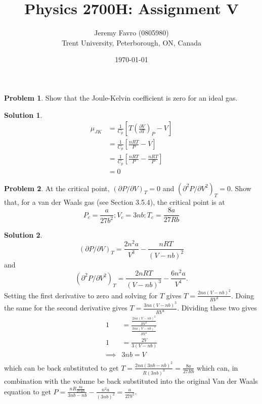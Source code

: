 \documentclass[10pt]{article}
\title{Physics 2700H: Assignment V}
\author{Jeremy Favro (0805980) \\ Trent University, Peterborough, ON, Canada}
\date{\today}
\theoremstyle{definition}
\newtheorem{problem}{Problem}
\newtheorem{soln}{Solution}
\begin{document}
\maketitle

\begin{problem}
Show that the Joule-Kelvin coefficient is zero for an ideal gas.
\end{problem}
\begin{soln}
  \begin{align*}
    \mu_{JK} & =\frac{1}{C_p}\left[T\left(\frac{\partial V}{\partial T}\right)_P-V\right] \\
             & =\frac{1}{C_p}\left[\frac{nRT}{P}-V\right]                                 \\
             & =\frac{1}{C_p}\left[\frac{nRT}{P}-\frac{nRT}{P}\right]                     \\
             & = 0
  \end{align*}
\end{soln}

\begin{problem}
At the critical point, $(\partial P/\partial V)_T = 0$ and $(\partial^2 P/\partial V^2)_T = 0$. Show that, for a
van der Waals gas (see Section 3.5.4), the critical point is at
$$P_c=\frac{a}{27b^2};V_c=3nb; T_c=\frac{8a}{27Rb}$$
\end{problem}
\begin{soln}
  $$(\partial P/\partial V)_T=\frac{2n^2a}{V^3}-\frac{nRT}{\left(V-nb\right)^2}$$
  and
  $$(\partial^2 P/\partial V^2)_T=\frac{2nRT}{\left(V-nb\right)^3}-\frac{6n^2a}{V^4}.$$
  Setting the first derivative to zero and solving for $T$ gives $T=\frac{2na\left(V-nb\right)^2}{RV^3}$. Doing
  the same for the second derivative gives $T=\frac{3na\left(V-nb\right)^3}{RV^4}$. Dividing these two gives
  \begin{align*}
    1        & = \frac{\frac{2na\left(V-nb\right)^2}{RV^3}}{\frac{3na\left(V-nb\right)^3}{RV^4}} \\
    1        & = \frac{2V}{3\left(V-nb\right)}                                                   \\
    \implies & 3nb  = V                                                                          \\
  \end{align*}
  which can be back substituted to get $T=\frac{2na\left(3nb-nb\right)^2}{R(3nb)^3}=\frac{8a}{27Rb}$ which can, in combination with the volume be back substituted into
  the original Van der Waals equation to get $P=\frac{nR\frac{8a}{27Rb}}{3nb-nb}-\frac{n^2a}{(3nb)^2}=\frac{a}{27b^2}$.
\end{soln}
\newpage
\end{document}
